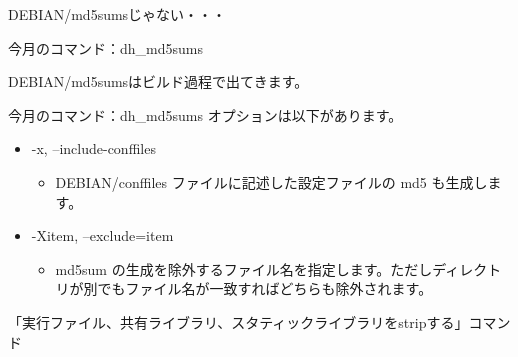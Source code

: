 \begin{frame}
\begin{center}
\LARGE{DEBIAN/md5sumsじゃない・・・}
\end{center}
\end{frame}

\begin{frame}[fragile]{今月のコマンド：dh\_md5sums}

DEBIAN/md5sumsはビルド過程で出てきます。

\end{frame}

\begin{frame}[fragile]{今月のコマンド：dh\_md5sums}
オプションは以下があります。
 \begin{itemize}
  \item -x, --include-conffiles
  \begin{itemize}
   \item DEBIAN/conffiles ファイルに記述した設定ファイルの md5 も生成します。
  \end{itemize}
  \item -Xitem, --exclude=item
  \begin{itemize}
   \item md5sum の生成を除外するファイル名を指定します。ただしディレクトリが別でもファイル名が一致すればどちらも除外されます。
  \end{itemize}
 \end{itemize}
\end{frame}


\begin{frame}
\begin{center}
\LARGE{「実行ファイル、共有ライブラリ、スタティックライブラリをstripする」コマンド}
\end{center}
\end{frame}


